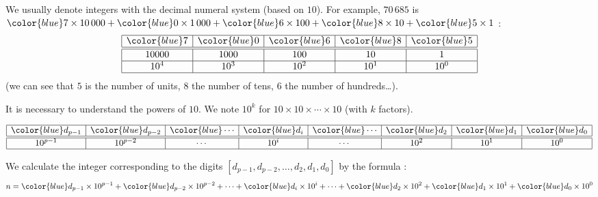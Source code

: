 \documentclass[11pt,class=report,crop=false]{standalone}
\begin{document}





\begin{cours}


We usually denote integers with the decimal numeral system (based on $10$). For example, $70\,685$ is 
${\color{blue}7} \times 10\,000
+{\color{blue}0} \times 1\,000
+{\color{blue}6} \times 100
+{\color{blue}8} \times 10 
+{\color{blue}5} \times 1$ : 
$$
\begin{array}{|c|c|c|c|c|}
  \hline
  {\color{blue}7} & {\color{blue}0} & {\color{blue}6} & {\color{blue}8} & {\color{blue}5} \\ 
  \hline\hline
  10000 & 1000 & 100 & 10 & 1 \\\hline
  10^4 & 10^3 & 10^2 & 10^1 & 10^0 \\
  \hline
\end{array}
$$   
(we can see that $5$ is the number of units, $8$ the number of tens, $6$ the number of hundreds\ldots). 

It is necessary to understand the powers of $10$. We note $10^k$ for $10 \times 10 \times \cdots \times 10$ (with $k$ factors).

$$
\begin{array}{|c|c|c|c|c|c|c|c|}
  \hline
  {\color{blue}d_{p-1}} & {\color{blue}d_{p-2}}& {\color{blue}\cdots} & {\color{blue}d_i}& {\color{blue}\cdots} & {\color{blue}d_2} & {\color{blue}d_1} & {\color{blue}d_0} \\ 
  \hline\hline
  10^{p-1} & 10^{p-2} & \cdots & 10^i &\cdots & 10^2 & 10^1 & 10^0 \\
  \hline
\end{array}
$$   
  
We calculate the integer corresponding to the digits $[d_{p-1},d_{p-2}, \ldots,d_2,d_1,d_0]$ by the formula :
$$n = {\color{blue}d_{p-1}} \times 10^{p-1} + {\color{blue}d_{p-2}} \times 10^{p-2} + \cdots + {\color{blue}d_i} \times 10^{i} +  \cdots + {\color{blue}d_2} \times 10^2 + {\color{blue}d_1} \times 10^1 + {\color{blue}d_0} \times 10^0$$
\end{cours}
\end{document}

